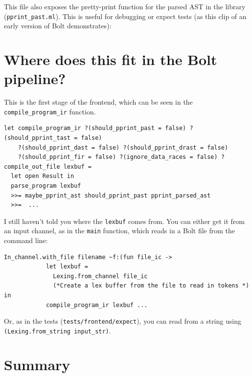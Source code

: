 This file also exposes the pretty-print function for the parsed AST in
the library (\texttt{pprint\_past.ml}). This is useful for debugging or
expect tests (as this clip of an early version of Bolt demonstrates):

\hypertarget{where-does-this-fit-in-the-bolt-pipeline}{%
\section{\texorpdfstring{\protect\hyperlink{where-does-this-fit-in-the-bolt-pipeline}{}Where
does this fit in the Bolt
pipeline?}{Where does this fit in the Bolt pipeline?}}\label{where-does-this-fit-in-the-bolt-pipeline}}

This is the first stage of the frontend, which can be seen in the
\texttt{compile\_program\_ir} function.

%

\begin{lstlisting}[caption={{compile\_program\_ir.ml}},language=caml]
let compile_program_ir ?(should_pprint_past = false) ?(should_pprint_tast = false)
    ?(should_pprint_dast = false) ?(should_pprint_drast = false)
    ?(should_pprint_fir = false) ?(ignore_data_races = false) ?compile_out_file lexbuf =
  let open Result in
  parse_program lexbuf
  >>= maybe_pprint_ast should_pprint_past pprint_parsed_ast
  >>=  ...
\end{lstlisting}

I still haven't told you where the \texttt{lexbuf} comes from. You can
either get it from an input channel, as in the \texttt{main} function,
which reads in a Bolt file from the command line:

%

\begin{lstlisting}[caption={main.ml},language=caml]
In_channel.with_file filename ~f:(fun file_ic ->
            let lexbuf =
              Lexing.from_channel file_ic
              (*Create a lex buffer from the file to read in tokens *) in
            compile_program_ir lexbuf ...
\end{lstlisting}

Or, as in the tests (\texttt{tests/frontend/expect}), you can read from
a string using \texttt{(Lexing.from\_string\ input\_str)}.

\hypertarget{summary}{%
\section{\texorpdfstring{\protect\hyperlink{summary}{}Summary}{Summary}}\label{summary}}


